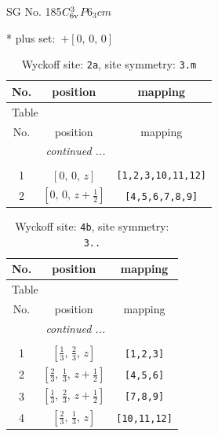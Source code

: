 \documentclass[fleqn,8pt]{jsarticle}
\begin{document}
\setcounter{MaxMatrixCols}{32}

\renewcommand{\tablename}{Table~}
\renewcommand{\figurename}{Figure~}
\begin{center}
\LARGE
SG No. 185\quad$C_{\rm 6v}^{3}$\quad$P6_3cm$\quad[ hexagonal ]
\end{center}
* plus set:\,\,\,$+\left[ 0,\, 0,\, 0 \right]$
\renewcommand{\arraystretch}{1.2}
\begin{longtable}{ccc}
\caption{Wyckoff site: {\tt 2a}, site symmetry: {\tt 3.m}}
 \\
 \hline \hline
No. & position & mapping \\ \hline \endfirsthead

\multicolumn{2}{l}{\tablename\ \thetable{}} \\
 \hline \hline
No. & position & mapping \\ \hline \endhead

 \hline \hline
\multicolumn{2}{r}{\footnotesize\it continued ...} \\ \endfoot

 \hline \hline
\multicolumn{2}{r}{} \\ \endlastfoot

1 & $\left[ 0,\, 0,\, z \right]$ & {\tt [1,2,3,10,11,12]} \\ \hline
2 & $\left[ 0,\, 0,\, z + \frac{1}{2} \right]$ & {\tt [4,5,6,7,8,9]} \\
\end{longtable}
\renewcommand{\arraystretch}{1.2}
\begin{longtable}{ccc}
\caption{Wyckoff site: {\tt 4b}, site symmetry: {\tt 3..}}
 \\
 \hline \hline
No. & position & mapping \\ \hline \endfirsthead

\multicolumn{2}{l}{\tablename\ \thetable{}} \\
 \hline \hline
No. & position & mapping \\ \hline \endhead

 \hline \hline
\multicolumn{2}{r}{\footnotesize\it continued ...} \\ \endfoot

 \hline \hline
\multicolumn{2}{r}{} \\ \endlastfoot

1 & $\left[ \frac{1}{3},\, \frac{2}{3},\, z \right]$ & {\tt [1,2,3]} \\ \hline
2 & $\left[ \frac{2}{3},\, \frac{1}{3},\, z + \frac{1}{2} \right]$ & {\tt [4,5,6]} \\ \hline
3 & $\left[ \frac{1}{3},\, \frac{2}{3},\, z + \frac{1}{2} \right]$ & {\tt [7,8,9]} \\ \hline
4 & $\left[ \frac{2}{3},\, \frac{1}{3},\, z \right]$ & {\tt [10,11,12]} \\
\end{longtable}
\end{document}
